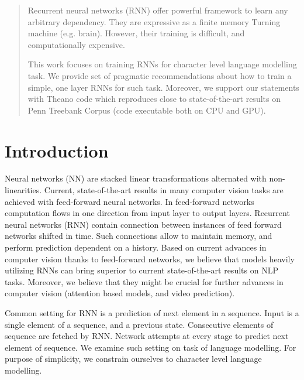 \documentclass{article}
\begin{document}
 


\begin{abstract} 
  Recurrent neural networks (RNN) offer powerful framework to learn any arbitrary dependency.
  They are expressive as a finite memory Turning machine (e.g. brain). However, their 
  training is difficult, and computationally expensive.


  This work focuses on training RNNs for character level language modelling task. 
  We provide set of pragmatic recommendations about how to train a simple, one layer RNNs 
  for such task.
  Moreover, we support our statements with Theano \cite{bergstra+al:2010-scipy} code which reproduces close to state-of-the-art results
  on Penn Treebank Corpus (code executable both on CPU and GPU). 
\end{abstract} 

\section{Introduction}
Neural networks (NN) are stacked linear transformations alternated with non-linearities. 
Current, state-of-the-art results in many computer vision tasks are achieved with feed-forward neural networks.
In feed-forward networks computation flows in one direction from input layer to output layers.
Recurrent neural networks (RNN) contain connection between instances
of feed forward networks shifted in time. Such connections allow to maintain memory, and perform prediction dependent on
a history. Based on current advances in computer vision thanks to feed-forward networks, we believe
that models heavily utilizing RNNs can bring superior to current state-of-the-art results on NLP tasks.
Moreover, we believe that they might be crucial for further advances in computer vision (attention based models, 
and video prediction). 


Common setting for RNN is a prediction of next element in a sequence. Input is a single element of 
a sequence, and a previous state. 
Consecutive elements of sequence are fetched by RNN. Network attempts at every stage to predict next element of sequence.
We examine such setting on task of language modelling. For purpose of simplicity, we
constrain ourselves to character level language modelling.
\end{document}
